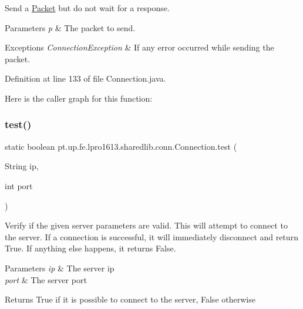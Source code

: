 Send a \hyperlink{classpt_1_1up_1_1fe_1_1lpro1613_1_1sharedlib_1_1conn_1_1_packet}{Packet} but do not wait for a response.


\begin{DoxyParams}{Parameters}
{\em p} & The packet to send. \\
\hline
\end{DoxyParams}

\begin{DoxyExceptions}{Exceptions}
{\em Connection\+Exception} & If any error occurred while sending the packet. \\
\hline
\end{DoxyExceptions}


Definition at line 133 of file Connection.\+java.

Here is the caller graph for this function\+:
\hypertarget{classpt_1_1up_1_1fe_1_1lpro1613_1_1sharedlib_1_1conn_1_1_connection_a9431e4e6dd9b16f463bd75079bd8c371}{}\label{classpt_1_1up_1_1fe_1_1lpro1613_1_1sharedlib_1_1conn_1_1_connection_a9431e4e6dd9b16f463bd75079bd8c371} 
\subsubsection{\texorpdfstring{test()}{test()}}
{\footnotesize\ttfamily static boolean pt.\+up.\+fe.\+lpro1613.\+sharedlib.\+conn.\+Connection.\+test (\begin{DoxyParamCaption}\item[{String}]{ip,  }\item[{int}]{port }\end{DoxyParamCaption})\hspace{0.3cm}{\ttfamily [static]}}

Verify if the given server parameters are valid. This will attempt to connect to the server. If a connection is successful, it will immediately disconnect and return True. If anything else happens, it returns False.


\begin{DoxyParams}{Parameters}
{\em ip} & The server ip \\
\hline
{\em port} & The server port \\
\hline
\end{DoxyParams}
\begin{DoxyReturn}{Returns}
True if it is possible to connect to the server, False otherwise 
\end{DoxyReturn}


